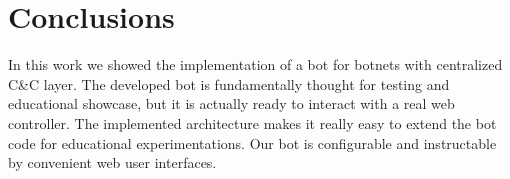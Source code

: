 \section{Conclusions}
\label{sec:conclusions}

In this work we showed the implementation of a bot for botnets with centralized C\&C layer. The developed bot is fundamentally thought for testing and educational showcase, but it is actually ready to interact with a real web controller.
The implemented architecture makes it really easy to extend the bot code for educational experimentations.
Our bot is configurable and instructable by convenient web user interfaces.
